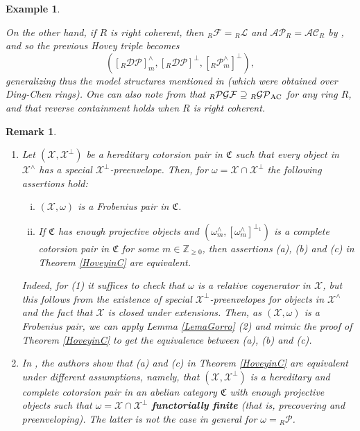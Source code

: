 \documentclass[10pt,reqno]{amsart}
\numberwithin{equation}{section}
\newtheorem{remark}[definition]{Remark}
\newtheorem{example}[definition]{Example}
\theoremstyle{remark}
\newcommand{\C}{\mathfrak{C}}
\newcommand{\X}{\mathcal{X}}
\begin{document}
\begin{example}
\begin{enumerate}[(1)]
On the other hand, if $R$ is right coherent, then ${}_R\mathcal{F} = {}_R\mathcal{L}$ and $\mathcal{AP}_R = \mathcal{AC}_R$ by \cite[Corolls. 2.9 \& 2.11]{BravoGillespieHovey-arxiv}, and so the previous Hovey triple becomes
\[
([{}_R\mathcal{DP}]^\wedge_m,[{}_R\mathcal{DP}]^\perp,[{}_R\mathcal{P}^\wedge_m]^\perp),
\] 
generalizing thus the model structures mentioned in \cite[p. 1466]{WeiWangLiu-DingModels} (which were obtained over Ding-Chen rings). One can also note from \cite[Thm. A.6]{BravoGillespieHovey-arxiv} that ${}_R\mathcal{PGF} \supseteq {}_R\mathcal{GP}_{\rm AC}$ for any ring $R$, and that reverse containment holds when $R$ is right coherent. 
\end{enumerate}
\end{example}


\begin{remark}\label{rmk:Frob_pair_from_aproxs} ~\
\begin{enumerate}[(1)]
\item Let $(\X,\X^\perp)$ be a hereditary cotorsion pair in $\C$ such that every object in $\X^\wedge$ has a special $\X^\perp$-preenvelope. Then, for $\omega = \X \cap \X^\perp$ the following assertions hold:
\begin{enumerate}[(i)]
\item $(\X,\omega)$ is a Frobenius pair in $\C$.

\item If $\C$ has enough projective objects and $(\omega^\wedge_m, [\omega^\wedge_m]^{\perp_1})$ is a complete cotorsion pair in $\C$ for some $m \in \mathbb{Z}_{\geq 0}$, then assertions (a), (b) and (c) in Theorem \ref{HoveyinC} are equivalent. 
\end{enumerate}
Indeed, for (1) it suffices to check that $\omega$ is a relative cogenerator in $\X$, but this follows from the existence of special $\X^\perp$-preenvelopes for objects in $\X^\wedge$ and the fact that $\X$ is closed under extensions. Then, as $(\X,\omega)$ is a Frobenius pair, we can apply Lemma \ref{LemaGorro} (2) and mimic the proof of Theorem \ref{HoveyinC} to get the equivalence between (a), (b) and (c). 

\item In \cite[Thm. VI.2.1]{BeligiannisReiten}, the authors show that (a) and (c) in Theorem \ref{HoveyinC} are equivalent under different assumptions, namely, that $(\mathcal{X},\mathcal{X}^\perp)$ is a hereditary and complete cotorsion pair in an abelian category $\C$ with enough projective objects such that $\omega = \mathcal{X} \cap \mathcal{X}^\perp$ \textbf{functorially finite} (that is, precovering and preenveloping). The latter is not the case in general for $\omega = {}_R\mathcal{P}$. 


\end{enumerate}
\end{remark}
\end{document}
